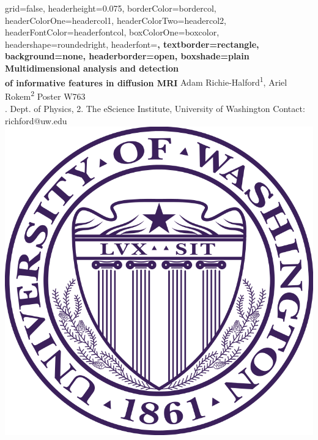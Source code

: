 \documentclass[a0paper,portrait,fontscale=0.395]{baposter}
\begin{document}
\begin{poster}{
grid=false,
headerheight=0.075\textheight,
borderColor=bordercol, %
headerColorOne=headercol1, %
headerColorTwo=headercol2, %
headerFontColor=headerfontcol, %
boxColorOne=boxcolor, %
headershape=roundedright, %
headerfont=\Large\sf\bf, %
textborder=rectangle,
background=none,
headerborder=open, %
boxshade=plain
}
{}
%
%
{\sf\bf Multidimensional analysis and detection \\ of informative features in diffusion MRI} %
{\vspace{0.5em} Adam Richie-Halford\textsuperscript{1}, Ariel Rokem\textsuperscript{2} \hfill Poster W763 \hspace{0.5em}\null \\ %
{. Dept. of Physics, 2. The eScience Institute, University of Washington \hfill Contact: richford@uw.edu \hspace{0.5em}\null}} %
{\includegraphics[scale=0.12]{UWlogo.png}} %
\vspace{-10em}


\end{poster}
\end{document}
